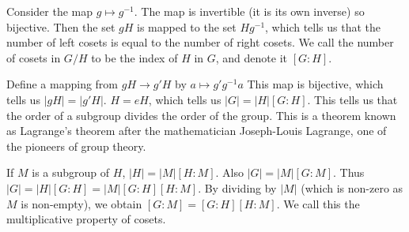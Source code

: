\documentclass{report}
\begin{document}
Consider the map $g \mapsto g^{-1}$. The map is invertible (it is its own inverse) so bijective. Then the set $gH$ is mapped to the set $Hg^{-1}$, which tells us that the number of left cosets is equal to the number of right cosets. We call the number of cosets in $G/H$ to be the index of $H$ in $G$, and denote it $[G:H]$.

Define a mapping from $gH \to g'H$ by $a \mapsto g'g^{-1}a$ This map is bijective, which tells us $|gH| = |g'H|$. $H = eH$, which tells us $|G| = |H|[G:H]$. This tells us that the order of a subgroup divides the order of the group. This is a theorem known as Lagrange's theorem after the mathematician Joseph-Louis Lagrange, one of the pioneers of group theory.

If $M$ is a subgroup of $H$, $|H| = |M|[H:M]$. Also $|G| = |M|[G:M]$. Thus $|G| = |H|[G:H] = |M|[G:H][H:M]$. By dividing by $|M|$ (which is non-zero as $M$ is non-empty), we obtain $[G:M] = [G:H][H:M]$. We call this the multiplicative property of cosets.
\end{document}
